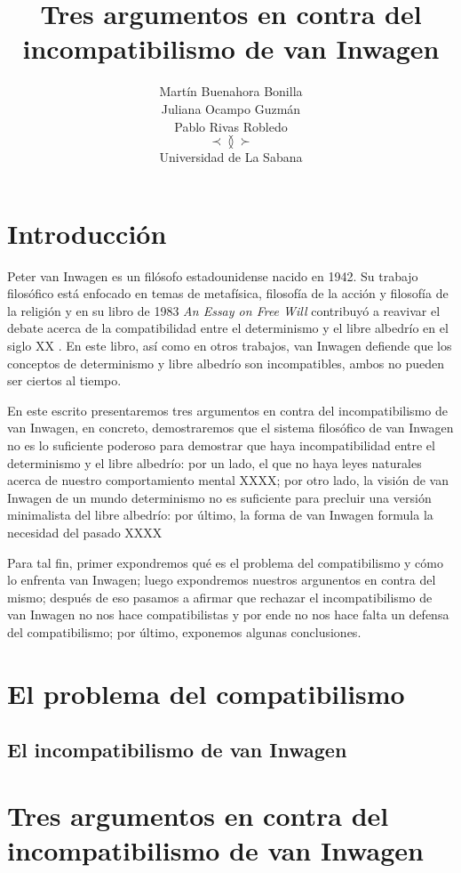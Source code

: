 \documentclass[12pt]{article} %
\title{Tres argumentos en contra del incompatibilismo de van Inwagen}
\author{Martín Buenahora Bonilla\\
		Juliana Ocampo Guzmán\\
		Pablo Rivas Robledo \\
		$\prec\between\succ$\\
       	Universidad de La Sabana\\}
\date{}
\begin{document}
\maketitle	


\section{Introducción}
Peter van Inwagen es un filósofo estadounidense nacido en 1942. Su trabajo filosófico está enfocado en temas de metafísica, filosofía de la acción y filosofía de la religión y en su libro de 1983 \textit{An Essay on Free Will} contribuyó a reavivar el debate acerca de la compatibilidad entre el determinismo y el libre albedrío en el siglo XX \parencites[23]{kane-free_will}[sec.1]{sep-incompatibilism-arguments}. En este libro, así como en otros trabajos, van Inwagen defiende que los conceptos de determinismo y libre albedrío son incompatibles, ambos no pueden ser ciertos al tiempo. 

En este escrito presentaremos tres argumentos en contra del incompatibilismo de van Inwagen, en concreto, demostraremos que el sistema filosófico de van Inwagen no es lo suficiente poderoso para demostrar que haya incompatibilidad entre el determinismo y el libre albedrío: por un lado, el que no haya leyes naturales acerca de nuestro comportamiento mental XXXX; por otro lado, la visión de van Inwagen de un mundo determinismo no es suficiente para precluir una versión minimalista del libre albedrío: por último, la forma de van Inwagen formula la necesidad del pasado XXXX

Para tal fin, primer expondremos qué es el problema del compatibilismo y cómo lo enfrenta van Inwagen; luego expondremos nuestros argunentos en contra del mismo; después de eso pasamos a afirmar que rechazar el incompatibilismo de van Inwagen no nos hace compatibilistas y por ende no nos hace falta un defensa del compatibilismo; por último, exponemos algunas conclusiones.

\section{El problema del compatibilismo}
	\subsection{El incompatibilismo de van Inwagen}
	
\section{Tres argumentos en contra del incompatibilismo de van Inwagen}
\end{document}
